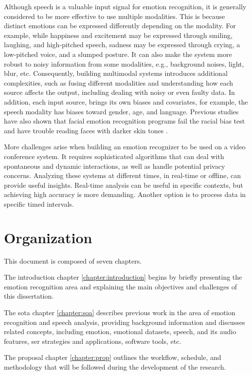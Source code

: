 Although speech is a valuable input signal for emotion recognition, it is generally considered to be more effective to use multiple modalities. This is because distinct emotions can be expressed differently depending on the modality. For example, while happiness and excitement may be expressed through smiling, laughing, and high-pitched speech, sadness may be expressed through crying, a low-pitched voice, and a slumped posture. It can also make the system more robust to noisy information from some modalities, e.g., background noises, light, blur, etc. Consequently, building multimodal systems introduces additional complexities, such as fusing different modalities and understanding how each source affects the output, including dealing with noisy or even faulty data. In addition, each input source, brings its own biases and covariates, for example, the speech modality has biases toward gender, age, and language. Previous studies have also shown that facial emotion recognition programs fail the racial bias test and have trouble reading faces with darker skin tones \cite{hagerty2021}.

More challenges arise when building an emotion recognizer to be used on a video conference system. It requires sophisticated algorithms that can deal with spontaneous and dynamic interactions, as well as handle potential privacy concerns. Analyzing these systems at different times, in real-time or offline, can provide useful insights. Real-time analysis can be useful in specific contexts, but achieving high accuracy is more demanding. Another option is to process data in specific timed intervals.

\section{Organization}

This document is composed of seven chapters.

The introduction chapter \ref{chapter:introduction} begins by briefly presenting the emotion recognition area and explaining the main objectives and challenges of this dissertation.

The \ac{sota} chapter \ref{chapter:soa} describes previous work in the area of emotion recognition and speech analysis, providing background information and discusses related concepts, including emotion, emotional datasets, speech, and its audio features, \ac{ser} strategies and applications, software tools, etc.

The proposal chapter \ref{chapter:prop} outlines the workflow, schedule, and methodology that will be followed during the development of the research.


